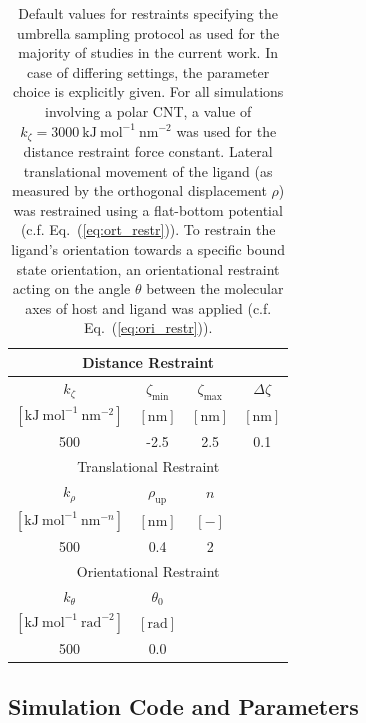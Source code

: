 \documentclass[9pt,lessons,pubversion]{livecoms}
\begin{document}
\begin{table}[ht]
\caption{\label{tbl:restr_1}
Default values for restraints specifying the umbrella sampling protocol as used for the majority of studies in the current work. 
In case of differing settings, the parameter choice is explicitly given.
For all simulations involving a polar CNT, a value of $k_\zeta = 3000~\mathrm{kJ~mol^{-1}~nm^{-2}}$ was used for the distance restraint force constant. 
Lateral translational movement of the ligand (as measured by the orthogonal displacement $\rho$) was restrained using a flat-bottom potential (c.f. Eq.~(\ref{eq:ort_restr})).
To restrain the ligand's orientation towards a specific bound state orientation, an orientational restraint acting on the angle $\theta$ between the molecular axes of host and ligand was applied (c.f. Eq.~(\ref{eq:ori_restr})). 
}
\centering
\begin{tabular}{cccc}\hline
\multicolumn{4}{c}{Distance Restraint} \\\hline
$k_\zeta$ & $\zeta_\mathrm{min}$ & $\zeta_\mathrm{max}$ & $\Delta \zeta$ \\
$[\mathrm{kJ~mol}^{-1}~\mathrm{nm}^{-2}]$ & $[\mathrm{nm}]$ & $[\mathrm{nm}]$ & $[\mathrm{nm}]$ \\ 
\hline
500 & -2.5 & 2.5 & 0.1 \\\hline\hline
\multicolumn{4}{c}{Translational Restraint}  \\\hline
$k_\rho$ & $\rho_\mathrm{up}$ & $n$ \\
$[\mathrm{kJ~mol}^{-1}~\mathrm{nm}^{-n}]$ & $[\mathrm{nm}]$ & $[-]$ \\ 
\hline 
500 & 0.4 & 2 \\\hline\hline
\multicolumn{4}{c}{Orientational Restraint}  \\\hline
$k_\theta$ & $\theta_0$ \\
$[\mathrm{kJ~mol}^{-1}~\mathrm{rad}^{-2}]$ & $[\mathrm{rad}]$  \\ 
\hline
500 & 0.0 \\\hline
\end{tabular}
\end{table}


\subsection{Simulation Code and Parameters}
\label{sec:simparam}
\end{document}
